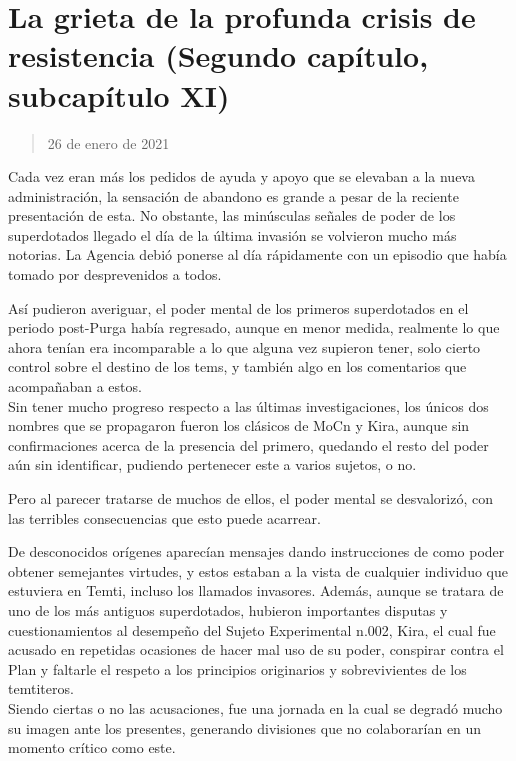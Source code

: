 \documentclass[
  spanish,
]{book}
\begin{document}
\hypertarget{la-grieta-de-la-profunda-crisis-de-resistencia-segundo-capuxedtulo-subcapuxedtulo-xi}{%
\section{La grieta de la profunda crisis de resistencia (Segundo capítulo, subcapítulo XI)}\label{la-grieta-de-la-profunda-crisis-de-resistencia-segundo-capuxedtulo-subcapuxedtulo-xi}}

\begin{quote}
26 de enero de 2021
\end{quote}

Cada vez eran más los pedidos de ayuda y apoyo que se elevaban a la nueva administración, la sensación de abandono es grande a pesar de la reciente presentación de esta. No obstante, las minúsculas señales de poder de los superdotados llegado el día de la última invasión se volvieron mucho más notorias. La Agencia debió ponerse al día rápidamente con un episodio que había tomado por desprevenidos a todos.

Así pudieron averiguar, el poder mental de los primeros superdotados en el periodo post-Purga había regresado, aunque en menor medida, realmente lo que ahora tenían era incomparable a lo que alguna vez supieron tener, solo cierto control sobre el destino de los tems, y también algo en los comentarios que acompañaban a estos.\\
Sin tener mucho progreso respecto a las últimas investigaciones, los únicos dos nombres que se propagaron fueron los clásicos de MoCn y Kira, aunque sin confirmaciones acerca de la presencia del primero, quedando el resto del poder aún sin identificar, pudiendo pertenecer este a varios sujetos, o no.

Pero al parecer tratarse de muchos de ellos, el poder mental se desvalorizó, con las terribles consecuencias que esto puede acarrear.

De desconocidos orígenes aparecían mensajes dando instrucciones de como poder obtener semejantes virtudes, y estos estaban a la vista de cualquier individuo que estuviera en Temti, incluso los llamados invasores. Además, aunque se tratara de uno de los más antiguos superdotados, hubieron importantes disputas y cuestionamientos al desempeño del Sujeto Experimental n.002, Kira, el cual fue acusado en repetidas ocasiones de hacer mal uso de su poder, conspirar contra el Plan y faltarle el respeto a los principios originarios y sobrevivientes de los temtiteros.\\
Siendo ciertas o no las acusaciones, fue una jornada en la cual se degradó mucho su imagen ante los presentes, generando divisiones que no colaborarían en un momento crítico como este.
\end{document}
